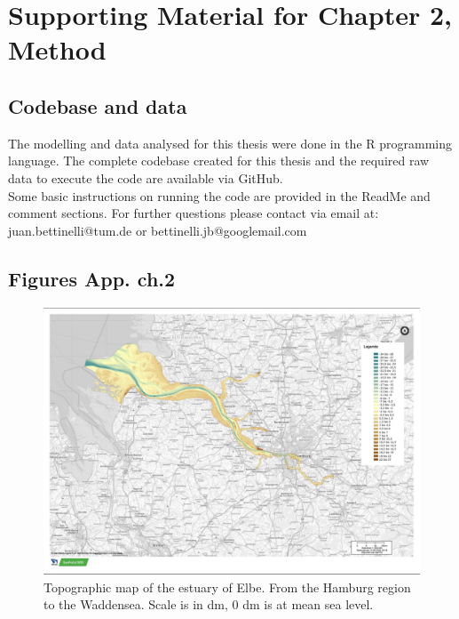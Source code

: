 \chapter{Supporting Material for Chapter 2, Method}
\label{cha:app2}
\section{Codebase and data}
The modelling and data analysed for this thesis were done in the R programming language. The complete codebase created for this thesis and the required raw data to execute the code are available via GitHub.\\
Some basic instructions on running the code are provided in the ReadMe and comment sections. For further questions please contact via email at: juan.bettinelli@tum.de or bettinelli.jb@googlemail.com



\section{Figures App. ch.2}
\begin{figure}[htbp]
 \centering
 \includegraphics[width=1\textwidth]{figures/Appendix/Map/TopographieElbeGesamt.jpg}
 \caption[Topographic map of Elbe]{Topographic map of the estuary of Elbe. From the Hamburg region to the Waddensea. Scale is in dm, 0 dm is at mean sea level. \cite{ZDMGDWS.2016}}
 \label{TopographyElbeTotal}
\end{figure}